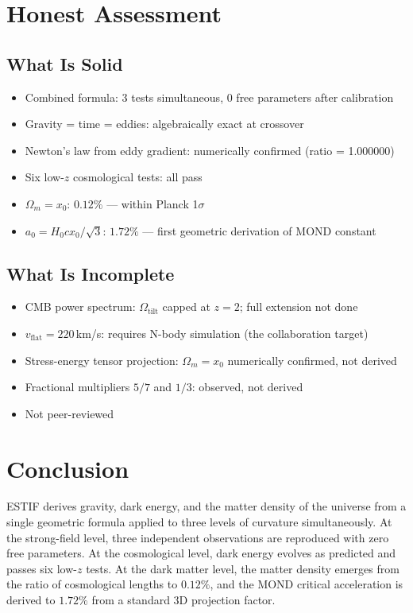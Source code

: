 \documentclass[12pt]{article}
\begin{document}
\section{Honest Assessment}

\subsection{What Is Solid}

\begin{itemize}
\item Combined formula: 3 tests simultaneous, 0 free parameters after calibration
\item Gravity = time = eddies: algebraically exact at crossover
\item Newton's law from eddy gradient: numerically confirmed (ratio = 1.000000)
\item Six low-$z$ cosmological tests: all pass
\item $\Omega_m = x_0$: $0.12\%$ — within Planck 1$\sigma$
\item $a_0 = H_0 c x_0/\sqrt{3}$: $1.72\%$ — first geometric derivation of MOND constant
\end{itemize}

\subsection{What Is Incomplete}

\begin{itemize}
\item CMB power spectrum: $\Omega_\text{tilt}$ capped at $z = 2$; full extension not done
\item $v_\text{flat} = 220$\,km/s: requires N-body simulation (the collaboration target)
\item Stress-energy tensor projection: $\Omega_m = x_0$ numerically confirmed, not derived
\item Fractional multipliers $5/7$ and $1/3$: observed, not derived
\item Not peer-reviewed
\end{itemize}

\section{Conclusion}

ESTIF derives gravity, dark energy, and the matter density of the universe from a
single geometric formula applied to three levels of curvature simultaneously.
At the strong-field level, three independent observations are reproduced with zero
free parameters. At the cosmological level, dark energy evolves as predicted and
passes six low-$z$ tests. At the dark matter level, the matter density emerges
from the ratio of cosmological lengths to $0.12\%$, and the MOND critical
acceleration is derived to $1.72\%$ from a standard 3D projection factor.
\end{document}
